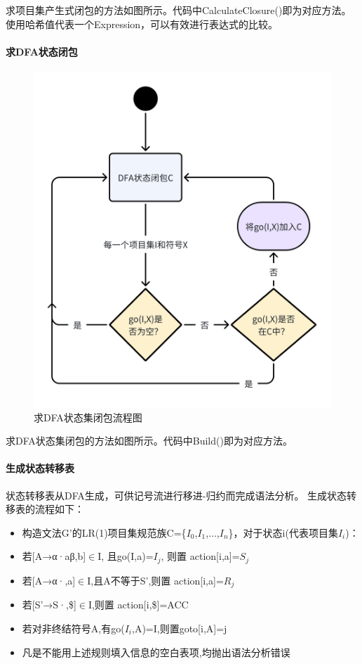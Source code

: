 \documentclass[../main.tex]{subfiles}
\begin{document}
求项目集产生式闭包的方法如图所示。代码中CalculateClosure()即为对应方法。使用哈希值代表一个Expression，可以有效进行表达式的比较。

\paragraph{求DFA状态闭包}

\begin{figure}[htbp]
\centering
\includegraphics[width=0.5\linewidth]{assets/DFA状态闭包流程图.png}
\caption{求DFA状态集闭包流程图}
\label{fig:求DFA状态集闭包流程图}
\end{figure}

求DFA状态集闭包的方法如图所示。代码中Build()即为对应方法。

\paragraph{生成状态转移表}

状态转移表从DFA生成，可供记号流进行移进-归约而完成语法分析。
生成状态转移表的流程如下：
\begin{itemize}
    \item 构造文法G'的LR(1)项目集规范族C=\{$I_0$,$I_1$,...,$I_n$\}，对于状态i(代表项目集$I_i$)：
    \item 若[A→α·aβ,b]$\in$I, 且go(I,a)=$I_j$, 则置 action[i,a]=$S_j$
    \item 若[A→α·,a]$\in$I,且A不等于S',则置 action[i,a]=$R_j$
    \item 若[S'→S·,\$]$\in$I,则置 action[i,\$]=ACC
    \item 若对非终结符号A,有go($I_i$,A)=I,则置goto[i,A]=j
    \item 凡是不能用上述规则填入信息的空白表项,均抛出语法分析错误
\end{itemize}
\end{document}
